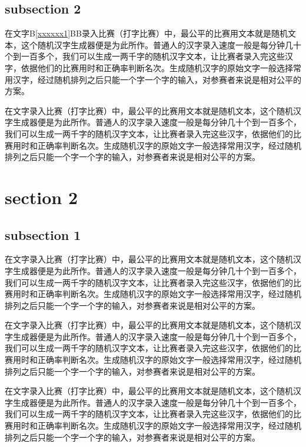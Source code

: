 \documentclass[12pt,hyperref,UTF8]{ctexbook}
\begin{document}
\subsection{subsection 2}

在文字B\ref{xxxxxx1}B\pageref{xxxxxx1}B录入比赛（打字比赛）中，最公平的比赛用文本就是随机文本，这个随机汉字生成器便是为此所作。普通人的汉字录入速度一般是每分钟几十个到一百多个，我们可以生成一两千字的随机汉字文本，让比赛者录入完这些汉字，依据他们的比赛用时和正确率判断名次。生成随机汉字的原始文字一般选择常用汉字，经过随机排列之后只能一个字一个字的输入，对参赛者来说是相对公平的方案。

在文字录入比赛（打字比赛）中，最公平的比赛用文本就是随机文本，这个随机汉字生成器便是为此所作。普通人的汉字录入速度一般是每分钟几十个到一百多个，我们可以生成一两千字的随机汉字文本，让比赛者录入完这些汉字，依据他们的比赛用时和正确率判断名次。生成随机汉字的原始文字一般选择常用汉字，经过随机排列之后只能一个字一个字的输入，对参赛者来说是相对公平的方案。

\section{section 2}

\subsection{subsection 1}

在文字录入比赛（打字比赛）中，最公平的比赛用文本就是随机文本，这个随机汉字生成器便是为此所作。普通人的汉字录入速度一般是每分钟几十个到一百多个，我们可以生成一两千字的随机汉字文本，让比赛者录入完这些汉字，依据他们的比赛用时和正确率判断名次。生成随机汉字的原始文字一般选择常用汉字，经过随机排列之后只能一个字一个字的输入，对参赛者来说是相对公平的方案。

在文字录入比赛（打字比赛）中，最公平的比赛用文本就是随机文本，这个随机汉字生成器便是为此所作。普通人的汉字录入速度一般是每分钟几十个到一百多个，我们可以生成一两千字的随机汉字文本，让比赛者录入完这些汉字，依据他们的比赛用时和正确率判断名次。生成随机汉字的原始文字一般选择常用汉字，经过随机排列之后只能一个字一个字的输入，对参赛者来说是相对公平的方案。

在文字录入比赛（打字比赛）中，最公平的比赛用文本就是随机文本，这个随机汉字生成器便是为此所作。普通人的汉字录入速度一般是每分钟几十个到一百多个，我们可以生成一两千字的随机汉字文本，让比赛者录入完这些汉字，依据他们的比赛用时和正确率判断名次。生成随机汉字的原始文字一般选择常用汉字，经过随机排列之后只能一个字一个字的输入，对参赛者来说是相对公平的方案。
\end{document}
